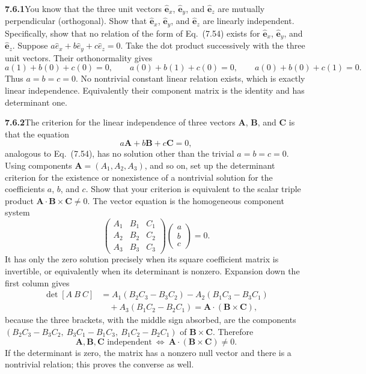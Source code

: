 \par\bigskip
\noindent\textbf{7.6.1}\quad You know that the three unit vectors
$\hat{\mathbf{e}}_{x}$, $\hat{\mathbf{e}}_{y}$, and $\hat{\mathbf{e}}_{z}$ are
mutually perpendicular (orthogonal). Show that $\hat{\mathbf{e}}_{x}$,
$\hat{\mathbf{e}}_{y}$, and $\hat{\mathbf{e}}_{z}$ are linearly independent.
Specifically, show that no relation of the form of Eq.~(7.54) exists for
$\hat{\mathbf{e}}_{x}$, $\hat{\mathbf{e}}_{y}$, and $\hat{\mathbf{e}}_{z}$.
\solution
Suppose $a\hat e_x+b\hat e_y+c\hat e_z=0$.
Take the dot product successively with the three unit vectors. Their
orthonormality gives
\[
a(1)+b(0)+c(0)=0,\qquad
 a(0)+b(1)+c(0)=0,\qquad a(0)+b(0)+c(1)=0.
\]
Thus $a=b=c=0$. No nontrivial constant linear relation exists, which is
exactly linear independence. Equivalently their component matrix is the
identity and has determinant one.

\par\bigskip
\noindent\textbf{7.6.2}\quad The criterion for the linear independence of
three vectors $\mathbf{A}$, $\mathbf{B}$, and $\mathbf{C}$ is that the
equation
\[
a\mathbf{A}+b\mathbf{B}+c\mathbf{C}=0,
\]
analogous to Eq.~(7.54), has no solution other than the trivial $a=b=c=0$.
Using components $\mathbf{A}=(A_{1},A_{2},A_{3})$, and so on, set up the
determinant criterion for the existence or nonexistence of a nontrivial
solution for the coefficients $a$, $b$, and $c$. Show that your criterion is
equivalent to the scalar triple product
$\mathbf{A}\cdot\mathbf{B}\times\mathbf{C}\neq0$.
\solution
The vector equation is the homogeneous component system
\[
\begin{pmatrix}A_1&B_1&C_1\\A_2&B_2&C_2\\A_3&B_3&C_3\end{pmatrix}
\begin{pmatrix}a\\b\\c\end{pmatrix}=0.
\]
It has only the zero solution precisely when its square coefficient
matrix is invertible, or equivalently when its determinant is nonzero.
Expansion down the first column gives
\begin{align*}
\det[A\ B\ C]
&=A_1(B_2C_3-B_3C_2)-A_2(B_1C_3-B_3C_1)\\
&\quad+A_3(B_1C_2-B_2C_1)
=\mathbf A\cdot(\mathbf B\times\mathbf C),
\end{align*}
because the three brackets, with the middle sign absorbed, are the
components $(B_2C_3-B_3C_2,\ B_3C_1-B_1C_3,\ B_1C_2-B_2C_1)$ of
$\mathbf B\times\mathbf C$.
Therefore
\[
\boxed{\mathbf A,\mathbf B,\mathbf C\text{ independent}
\ \Longleftrightarrow\ \mathbf A\cdot(\mathbf B\times\mathbf C)\ne0}.
\]
If the determinant is zero, the matrix has a nonzero null vector and
there is a nontrivial relation; this proves the converse as well.

